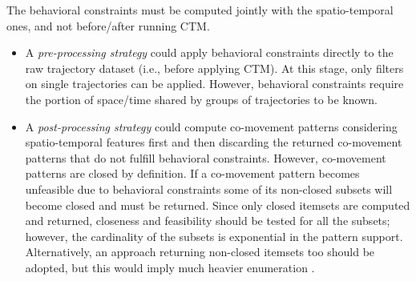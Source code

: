 \documentclass[preprint,12pt,authoryear]{elsarticle} %
\begin{document}
The behavioral constraints must be computed jointly with the spatio-temporal ones, and not before/after running CTM.
\begin{itemize}
    \item A \textit{pre-processing strategy} could apply behavioral constraints directly to the raw trajectory dataset (i.e., before applying CTM). 
    At this stage, only filters on single trajectories can be applied.
    However, behavioral constraints require the portion of space/time shared by groups of trajectories to be known. 
    \item A \textit{post-processing strategy} could compute co-movement patterns considering spatio-temporal features first and then discarding the returned co-movement patterns that do not fulfill behavioral constraints.
    However, co-movement patterns are closed by definition.
    If a co-movement pattern becomes unfeasible due to behavioral constraints some of its non-closed subsets will become closed and must be returned. 
    Since only closed itemsets are computed and returned, closeness and feasibility should be tested for all the subsets; however, the cardinality of the subsets is exponential in the pattern support.
    Alternatively, an approach returning non-closed itemsets too should be adopted, but this would imply much heavier enumeration \citep{DBLP:journals/tkde/LuccheseOP06}. 
\end{itemize}
\end{document}
